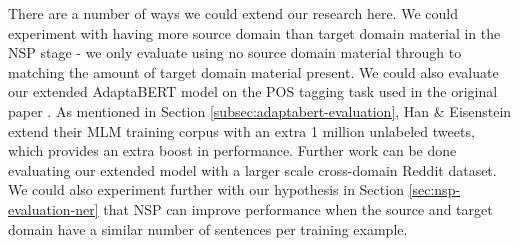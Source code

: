 There are a number of ways we could extend our research here. We could experiment with having more source domain than target domain material in the NSP stage - we only evaluate using no source domain material through to matching the amount of target domain material present. We could also evaluate our extended AdaptaBERT model on the POS tagging task used in the original paper \cite{adaptabert}. As mentioned in Section \ref{subsec:adaptabert-evaluation}, Han \& Eisenstein extend their MLM training corpus with an extra 1 million unlabeled tweets, which provides an extra boost in performance. Further work can be done evaluating our extended model with a larger scale cross-domain Reddit dataset. We could also experiment further with our hypothesis in Section \ref{sec:nsp-evaluation-ner} that NSP can improve performance when the source and target domain have a similar number of sentences per training example.